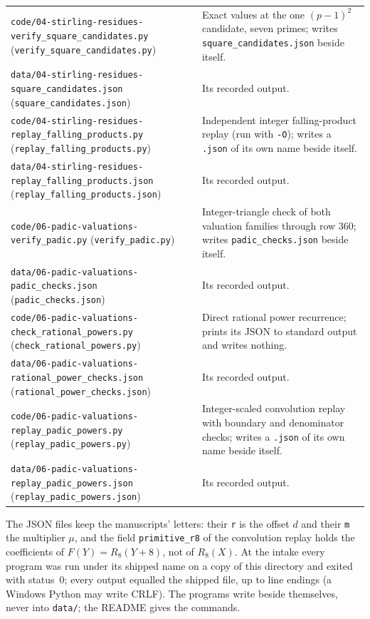 \documentclass[11pt,a4paper]{article}
\numberwithin{equation}{section}
\theoremstyle{definition}
\theoremstyle{remark}
\theoremstyle{plain}
\begin{document}
\begin{longtable}{@{}>{\raggedright\arraybackslash}p{}>{\raggedright\arraybackslash}p{}@{}}
\texttt{code/04-stirling-\allowbreak residues-\allowbreak verify\_square\_candidates.py} (\texttt{verify\_\allowbreak square\_\allowbreak candidates.py}) & Exact values at the one $(p-1)^2$ candidate, seven primes; writes \texttt{square\_\allowbreak candidates.json} beside itself.\\
\texttt{data/04-stirling-\allowbreak residues-\allowbreak square\_candidates.json} (\texttt{square\_\allowbreak candidates.json}) & Its recorded output.\\
\texttt{code/04-stirling-\allowbreak residues-\allowbreak replay\_falling\_products.py} (\texttt{replay\_\allowbreak falling\_\allowbreak products.py}) & Independent integer falling-product replay (run with \texttt{-O}); writes a \texttt{.json} of its own name beside itself.\\
\texttt{data/04-stirling-\allowbreak residues-\allowbreak replay\_falling\_products.json} (\texttt{replay\_\allowbreak falling\_\allowbreak products.json}) & Its recorded output.\\
\texttt{code/06-padic-\allowbreak valuations-\allowbreak verify\_padic.py} (\texttt{verify\_\allowbreak padic.py}) & Integer-triangle check of both valuation families through row $360$; writes \texttt{padic\_\allowbreak checks.json} beside itself.\\
\texttt{data/06-padic-\allowbreak valuations-\allowbreak padic\_checks.json} (\texttt{padic\_\allowbreak checks.json}) & Its recorded output.\\
\texttt{code/06-padic-\allowbreak valuations-\allowbreak check\_rational\_powers.py} (\texttt{check\_\allowbreak rational\_\allowbreak powers.py}) & Direct rational power recurrence; prints its JSON to standard output and writes nothing.\\
\texttt{data/06-padic-\allowbreak valuations-\allowbreak rational\_power\_checks.json} (\texttt{rational\_\allowbreak power\_\allowbreak checks.json}) & Its recorded output.\\
\texttt{code/06-padic-\allowbreak valuations-\allowbreak replay\_padic\_powers.py} (\texttt{replay\_\allowbreak padic\_\allowbreak powers.py}) & Integer-scaled convolution replay with boundary and denominator checks; writes a \texttt{.json} of its own name beside itself.\\
\texttt{data/06-padic-\allowbreak valuations-\allowbreak replay\_padic\_powers.json} (\texttt{replay\_\allowbreak padic\_\allowbreak powers.json}) & Its recorded output.\\
\bottomrule
\end{longtable}
\endgroup
\addtocounter{table}{-1}
The JSON files keep the manuscripts' letters: their \texttt{r} is the offset
$d$ and their \texttt{m} the multiplier $\mu$, and the field
\texttt{primitive\_r8} of the convolution replay holds the coefficients of
$F(Y)=R_8(Y+8)$, not of $R_8(X)$.  At the intake every program was run under
its shipped name on a copy of this directory and exited with status~0; every
output equalled the shipped file, up to line endings (a Windows Python may
write CRLF).  The programs write beside themselves, never into
\texttt{data/}; the README gives the commands.
\end{document}
